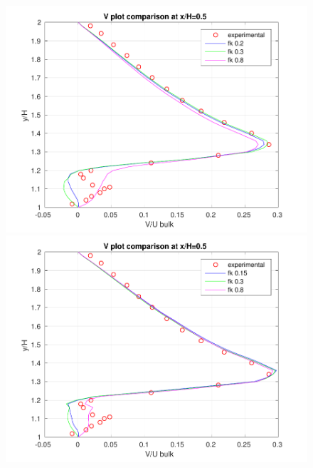 \begin{figure}[H]
\begin{minipage}[b]{0.5\linewidth}
\includegraphics[scale=0.5]{figure/coarse/V_coarse_five.pdf}
\end{minipage}
\begin{minipage}[b]{0.5\linewidth}
\includegraphics[scale=0.5]{figure/fine/V_fine_five.pdf}
\end{minipage}\\
\begin{minipage}[b]{0.5\linewidth}

\end{minipage}
\end{figure}
